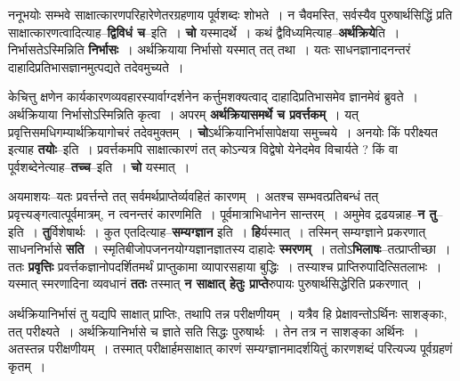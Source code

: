 \documentclass[article,12pt,a4paper]{memoir}
\begin{document}
	  \pstart ननूभयोः सम्भवे साक्षात्कारणपरिहारेणेतरग्रहणाय पूर्वशब्दः शोभते । न चैवमस्ति, सर्वस्यैव पुरुषार्थसिद्धिं प्रति साक्षात्कारणत्वादित्याह--\textbf{द्विविधं च}--इति । \textbf{चो} यस्मादर्थे । कथं द्वैविध्यमित्याह--\textbf{अर्थक्रिये}ति । निर्भासतेऽस्मिन्निति \textbf{निर्भासः} । अर्थक्रियाया निर्भासो यस्मात् तत् तथा । यतः साधनज्ञानादनन्तरं दाहादिप्रतिभासज्ञानमुत्पद्यते तदेवमुच्यते ।
	\pend
      

	  \pstart केचित्तु क्षणेन कार्यकारणव्यवहारस्यार्वाग्दर्शनेन कर्त्तुमशक्यत्वाद् दाहादिप्रतिभासमेव ज्ञानमेवं ब्रुवते । अर्थक्रियाया \leavevmode{} निर्भासोऽस्मिन्निति कृत्वा । अपरम् \textbf{अर्थक्रियासमर्थे च प्रवर्त्तकम्} । यत् प्रवृत्तिसमधिगम्यार्थक्रियागोचरं तदेवमुक्तम् । \textbf{चो}ऽर्थक्रियानिर्भासापेक्षया समुच्चये । अनयोः किं परीक्ष्यत इत्याह \textbf{तयोः}--इति । प्रवर्त्तकमपि साक्षात्कारणं तत् कोऽन्यत्र विद्वेषो येनेदमेव विचार्यते ? किं वा पूर्वशब्देनेत्याह--\textbf{तच्च}--इति । \textbf{चो} यस्मात् ।
	\pend
      

	  \pstart अयमाशयः--यतः प्रवर्त्तन्ते तत् सर्वमर्थप्राप्तेर्व्यवहितं कारणम् । अतश्च सम्भवत्प्रतिबन्धं तत् प्रवृत्त्यङ्गत्वात्पूर्वमात्रम्, न त्वनन्तरं कारणमिति । पूर्वमात्राभिधानेन सान्तरम् । अमुमेव द्रढयन्नाह--\textbf{न तु}--इति । \textbf{तु}र्विशेषार्थः । कुत एतदित्याह--\textbf{सम्यग्ज्ञान} इति । \textbf{हि}र्यस्मात् । तस्मिन् सम्यग्ज्ञाने प्रकरणात् साधननिर्भासे \textbf{सति} । स्मृतिबीजोपजननयोग्यज्ञानज्ञातस्य दाहादेः \textbf{स्मरणम्} । ततोऽ\textbf{भिलाषः}--तत्प्राप्तीच्छा । ततः \textbf{प्रवृत्तिः} प्रवर्त्तकज्ञानोपदर्शितमर्थं प्राप्तुकामा व्यापारसहाया बुद्धिः । तस्याश्च प्राप्तिरुपादित्सितलाभः । यस्मात् स्मरणादिना व्यवधानं \textbf{ततः} तस्मात् \textbf{न साक्षात् हेतुः प्राप्ते}रुपायः पुरुषार्थसिद्धेरिति प्रकरणात् ।
	\pend
	  \bigskip
	  \begingroup
	

	  \pstart अर्थक्रियानिर्भासं तु यद्यपि साक्षात् प्राप्तिः, तथापि तन्न परीक्षणीयम् । यत्रैव हि प्रेक्षावन्तोऽर्थिनः साशङ्काः, तत् परीक्ष्यते । अर्थक्रियानिर्भासे च ज्ञाते सति सिद्धः पुरुषार्थः । तेन तत्र न साशङ्का अर्थिनः । अतस्तन्न परीक्षणीयम् । तस्मात् परीक्षार्हमसाक्षात् कारणं सम्यग्ज्ञानमादर्शयितुं कारणशब्दं परित्यज्य पूर्वग्रहणं कृतम् ।
	\pend
      
\end{document}
